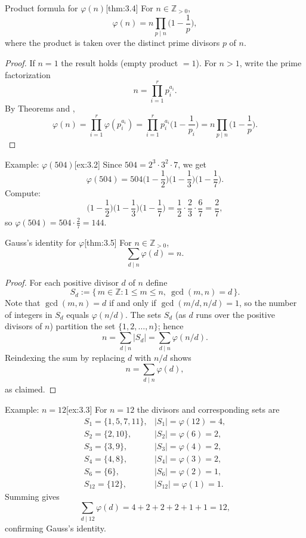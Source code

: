 \documentclass[10pt]{article}
\theoremstyle{definition}
\theoremstyle{plain}
\numberwithin{equation}{section}
\begin{document}
\begin{define}{Product formula for $\varphi(n)$}[thm:3.4]
For $n\in\mathbb{Z}_{>0}$,
\[
\varphi(n)=n\prod_{p\mid n}\Big(1-\frac{1}{p}\Big),
\]
where the product is taken over the distinct prime divisors $p$ of $n$.
\end{define}

\begin{proof}
If $n=1$ the result holds (empty product $=1$). For $n>1$, write the prime factorization
\[
n=\prod_{i=1}^r p_i^{a_i}.
\]
By Theorems  and ,
\[
\varphi(n)=\prod_{i=1}^r \varphi(p_i^{a_i})
=\prod_{i=1}^r p_i^{a_i}\Big(1-\frac{1}{p_i}\Big)
= n\prod_{p\mid n}\Big(1-\frac{1}{p}\Big).
\]
\end{proof}

\begin{define}{Example: $\varphi(504)$}[ex:3.2]
Since $504=2^3\cdot 3^2\cdot 7$, we get
\[
\varphi(504)=504\Big(1-\frac{1}{2}\Big)\Big(1-\frac{1}{3}\Big)\Big(1-\frac{1}{7}\Big).
\]
Compute:
\[
\Big(1-\frac{1}{2}\Big)\Big(1-\frac{1}{3}\Big)\Big(1-\frac{1}{7}\Big)
=\frac12\cdot\frac23\cdot\frac67=\frac{2}{7},
\]
so $\varphi(504)=504\cdot\frac{2}{7}=144$.
\end{define}

\bigskip

\begin{define}{Gauss's identity for $\varphi$}[thm:3.5]
For $n\in\mathbb{Z}_{>0}$,
\[
\sum_{d\mid n} \varphi(d)=n.
\]
\end{define}

\begin{proof}
For each positive divisor $d$ of $n$ define
\[
S_d:=\{\,m\in\mathbb{Z} : 1\le m\le n,\ \gcd(m,n)=d\,\}.
\]
Note that $\gcd(m,n)=d$ if and only if $\gcd(m/d,n/d)=1$, so the number of integers in $S_d$ equals $\varphi(n/d)$. The sets $S_d$ (as $d$ runs over the positive divisors of $n$) partition the set $\{1,2,\dots,n\}$; hence
\[
n=\sum_{d\mid n} |S_d| = \sum_{d\mid n} \varphi(n/d).
\]
Reindexing the sum by replacing $d$ with $n/d$ shows
\[
n=\sum_{d\mid n} \varphi(d),
\]
as claimed.
\end{proof}

\begin{define}{Example: $n=12$}[ex:3.3]
For $n=12$ the divisors and corresponding sets are
\[
\begin{array}{ll}
S_1=\{1,5,7,11\}, & |S_1|=\varphi(12)=4,\\[4pt]
S_2=\{2,10\}, & |S_2|=\varphi(6)=2,\\[4pt]
S_3=\{3,9\}, & |S_3|=\varphi(4)=2,\\[4pt]
S_4=\{4,8\}, & |S_4|=\varphi(3)=2,\\[4pt]
S_6=\{6\}, & |S_6|=\varphi(2)=1,\\[4pt]
S_{12}=\{12\}, & |S_{12}|=\varphi(1)=1.
\end{array}
\]
Summing gives
\[
\sum_{d\mid 12}\varphi(d)=4+2+2+2+1+1=12,
\]
confirming Gauss's identity.
\end{define}
\end{document}
